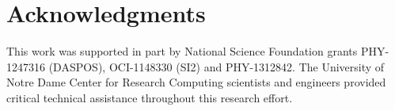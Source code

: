 \documentclass{sig-alternate}
\begin{document}
\section*{Acknowledgments}

This work was supported in part by National Science Foundation grants PHY-1247316 (DASPOS), 
OCI-1148330 (SI2) and PHY-1312842.
The University of Notre Dame Center for Research Computing scientists and engineers provided critical technical assistance throughout this research effort.


\end{document}
